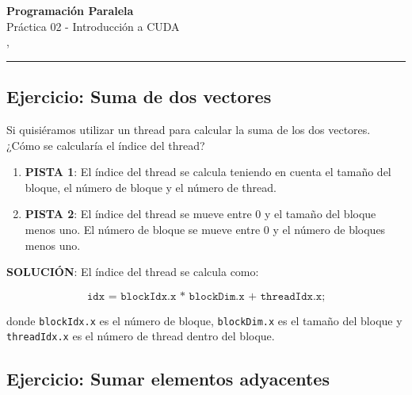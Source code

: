 



\begin{center}
    \LARGE\textbf{Programación Paralela} \\
    \Large{Práctica 02 - Introducción a CUDA} \\
    \normalsize{\currentsemester, \currentyear} \\
    \vspace{1em}
    \hrule
\end{center}

\setcounter{section}{2}



\newpage

\tableofcontents

\newpage

\subsection{Ejercicio: Suma de dos vectores}

Si quisiéramos utilizar un thread para calcular la suma de los dos vectores. ¿Cómo se calcularía el índice del thread?

\begin{enumerate}
  \item \textbf{PISTA 1}: El índice del thread se calcula teniendo en cuenta el tamaño del bloque, el número de bloque y
    el número de thread.

  \item \textbf{PISTA 2}: El índice del thread se mueve entre 0 y el tamaño del bloque menos uno. El número de bloque
    se mueve entre 0 y el número de bloques menos uno.

\end{enumerate}

\textbf{SOLUCIÓN}: El índice del thread se calcula como:

\begin{equation}
  \texttt{idx = blockIdx.x * blockDim.x + threadIdx.x;}
\end{equation}

donde \texttt{blockIdx.x} es el número de bloque, \texttt{blockDim.x} es el tamaño del bloque y \texttt{threadIdx.x} es
el número de thread dentro del bloque.

\subsection{Ejercicio: Sumar elementos adyacentes}

